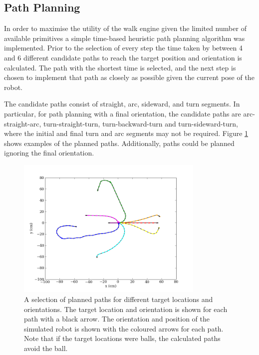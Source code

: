 \subsection{Path Planning}

In order to maximise the utility of the walk engine given the limited number of available primitives a simple time-based heuristic path planning algorithm was implemented. Prior to the selection of every step the time taken by between 4 and 6 different candidate paths to reach the target position and orientation is calculated. The path with the shortest time is selected, and the next step is chosen to implement that path as closely as possible given the current pose of the robot.

The candidate paths consist of straight, arc, sideward, and turn segments.  In particular, for path planning with a final orientation, the candidate paths are arc-straight-arc, turn-straight-turn, turn-backward-turn and turn-sideward-turn, where the initial and final turn and arc segments may not be required. Figure \ref{fig:LocomotionPathPlanning} shows examples of the planned paths. Additionally, paths could be planned ignoring the final orientation.

\begin{figure}[tbh]
	\begin{center}
		\includegraphics[width=0.8\textwidth]{locomotionfigs/pathplanning.png}
		\caption{A selection of planned paths for different target locations and orientations. The target location and orientation is shown for each path with a black arrow. The orientation and position of the simulated robot is shown with the coloured arrows for each path. Note that if the target locations were balls, the calculated paths avoid the ball.}
		\label{fig:LocomotionPathPlanning}
	\end{center}
\end{figure}

